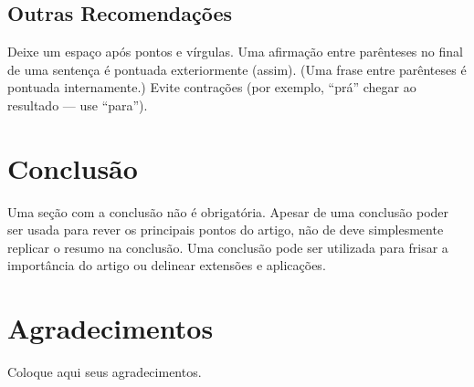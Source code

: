 \documentclass[a4paper]{ifacconf}
\begin{document}
\subsection{Outras Recomendações}

Deixe um espaço após pontos e vírgulas. 
Uma afirmação entre parênteses no final de uma sentença é pontuada exteriormente
(assim). (Uma frase entre parênteses é pontuada internamente.) Evite contrações
(por exemplo, ``prá'' chegar ao resultado --- use ``para''). 




\section{Conclusão}

Uma seção com a conclusão não é obrigatória. Apesar de uma conclusão poder ser usada
para rever os principais pontos do artigo, não de deve simplesmente replicar o resumo
na conclusão. Uma conclusão pode ser utilizada para frisar a importância do artigo
ou delinear extensões e aplicações. 


\section*{Agradecimentos}
Coloque aqui seus agradecimentos. 

                                                   




\end{document}
